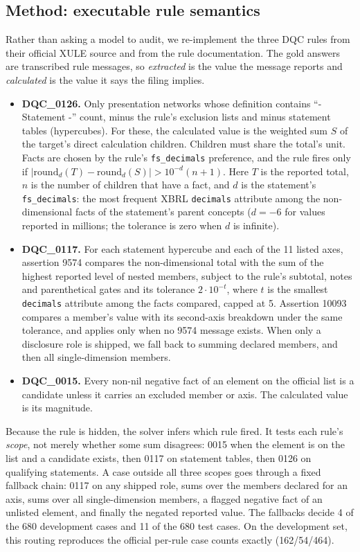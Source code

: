 \documentclass[conference]{IEEEtran}
\begin{document}
\subsection{Method: executable rule semantics}
Rather than asking a model to audit, we re-implement the three DQC rules from their official XULE
source and from the rule documentation. The gold answers are transcribed rule messages, so
\emph{extracted} is the value the message reports and \emph{calculated} is the value it says the filing implies.
\begin{itemize}
\item \textbf{DQC\_0126.} Only presentation networks whose definition contains ``- Statement -'' count, minus the rule's
exclusion lists and minus statement tables (hypercubes). For these, the calculated value is the weighted sum $S$ of the
target's direct calculation children. Children must share the total's unit. Facts are chosen by the rule's
\texttt{fs\_decimals} preference, and the rule fires only if
$|\mathrm{round}_d(T)-\mathrm{round}_d(S)| > 10^{-d}(n{+}1)$. Here $T$ is the reported total, $n$ is the number of
children that have a fact, and $d$ is the statement's \texttt{fs\_decimals}: the most frequent XBRL \texttt{decimals}
attribute among the non-dimensional facts of the statement's parent concepts ($d=-6$ for values reported in
millions; the tolerance is zero when $d$ is infinite).
\item \textbf{DQC\_0117.} For each statement hypercube and each of the 11 listed axes, assertion 9574 compares the
non-dimensional total with the sum of the highest reported level of nested members, subject to the rule's subtotal,
notes and parenthetical gates and its tolerance $2\cdot 10^{-t}$, where $t$ is the smallest \texttt{decimals}
attribute among the facts compared, capped at 5. Assertion 10093 compares a member's value with its
second-axis breakdown under the same tolerance, and applies only when no 9574 message exists. When only a disclosure
role is shipped, we fall back to summing declared members, and then
all single-dimension members.
\item \textbf{DQC\_0015.} Every non-nil negative fact of an element on the official list is a candidate unless it
carries an excluded member or axis. The calculated value is its magnitude.
\end{itemize}
Because the rule is hidden, the solver infers which rule fired. It tests each rule's \emph{scope}, not merely whether
some sum disagrees: 0015 when the element is on the list and a candidate exists, then 0117 on statement tables, then
0126 on qualifying statements. A case outside all three scopes goes through a fixed fallback chain: 0117 on any
shipped role, sums over the members declared for an axis, sums over all single-dimension members, a flagged negative
fact of an unlisted element, and finally the negated reported value. The fallbacks decide 4 of the 680 development
cases and 11 of the 680 test cases. On the development set, this routing reproduces the official per-rule
case counts exactly (162/54/464).
\end{document}
